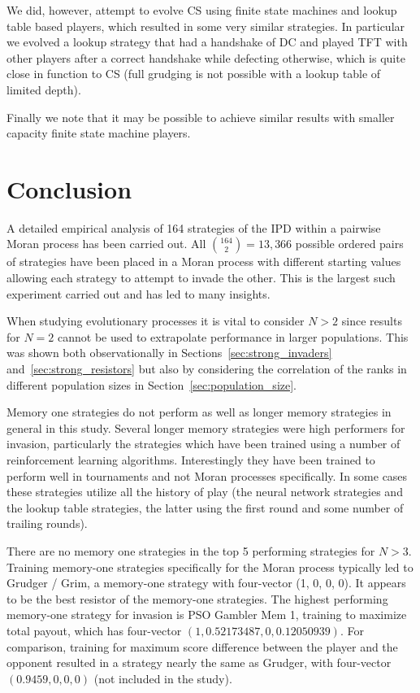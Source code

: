 \documentclass[10pt,journal]{IEEEtran}
\begin{document}
We did, however, attempt to evolve CS using finite state machines and lookup table
based players,
which resulted in some very similar strategies. In particular we evolved a
lookup strategy that had a handshake of DC and played TFT with other players
after a correct handshake while defecting otherwise, which is quite close in
function to CS (full grudging is not possible with a lookup table of limited
depth).

Finally we note that it may be possible to achieve similar results with smaller
capacity finite state machine players.

\section{Conclusion}\label{sec:conclusion}

A detailed empirical analysis of 164 strategies of the IPD within a pairwise
Moran process has been carried out. All \(\binom{164}{2}=13,366\) possible
ordered pairs of strategies have been placed in a Moran process with different
starting values allowing each strategy to attempt to invade the other.
This is the largest such experiment carried out and has led to many insights.

When studying evolutionary processes it is vital to consider \(N>2\) since
results for \(N=2\) cannot be used to extrapolate performance in larger
populations. This was shown both observationally in
Sections~\ref{sec:strong_invaders} and~\ref{sec:strong_resistors} but also by
considering the correlation of the ranks in different population sizes in
Section~\ref{sec:population_size}.

Memory one strategies do not perform as well as longer memory strategies in general
in this study. Several longer memory strategies were high performers for invasion,
particularly the strategies which have been trained using a number of reinforcement
learning algorithms. Interestingly they have been trained to perform well in
tournaments and not Moran processes specifically. In some cases these strategies
utilize all the history of play (the neural network strategies and the lookup
table strategies, the latter using the first round and some number of trailing rounds).

There are no memory one strategies in the top 5 performing strategies
for \(N>3\). Training memory-one strategies specifically for the Moran process
typically led to Grudger / Grim, a memory-one strategy with
four-vector (1, 0, 0, 0). It appears to be the best resistor of the memory-one strategies.
The highest performing memory-one strategy for invasion is PSO Gambler Mem 1,
training to maximize total payout, which has four-vector $(1, 0.52173487, 0, 0.12050939)$.
For comparison, training for maximum score difference between the player and the
opponent resulted in a strategy nearly the same as Grudger, with four-vector
$(0.9459, 0, 0, 0)$ (not included in the study).
\end{document}
